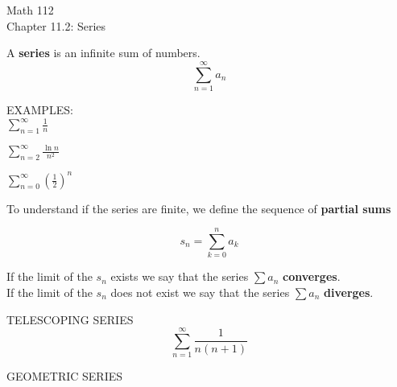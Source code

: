 \documentclass[11pt]{article}
\begin{document}
\begin{center}
\Large
\rm{Math 112}
\\
\rm{Chapter 11.2:  Series}
\\
\end{center}
\vspace{0.2in}


A {\bf series} is an infinite sum of numbers.\\

\begin{displaymath}
\sum_{n=1}^{\infty} a_n
  \end{displaymath}

\vspace{.3in}



EXAMPLES:\\


$\sum_{n=1}^{\infty} \frac{1}{n}$

\vspace{0.3in}

$\sum_{n=2}^{\infty}  \frac{\ln{n}}{n^2}$

\vspace{0.3in}

$\sum_{n=0}^{\infty} \left(\frac12\right)^n $

\vspace{0.3in}


To understand if the series are finite, we define the sequence of {\bf partial sums} 

\begin{displaymath}
s_n = \sum_{k=0}^{n} a_k
  \end{displaymath}
\vspace{1.75in}

If the limit of the $s_n$ exists we say that the series $\sum a_n$ {\bf converges}. \\
If the limit of the $s_n$ does not exist we say that the series $\sum a_n$ {\bf diverges}.

\pagebreak

TELESCOPING SERIES\\

\begin{displaymath}
\sum_{n=1}^{\infty} \frac{1}{n(n+1)}
  \end{displaymath}



\vspace{2.5in}

GEOMETRIC SERIES
\end{document}
